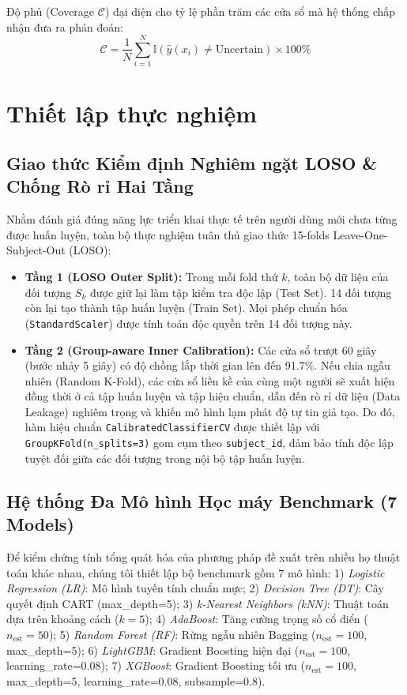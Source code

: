 \documentclass[conference]{IEEEtran}
\begin{document}
Độ phủ (Coverage $\mathcal{C}$) đại diện cho tỷ lệ phần trăm các cửa sổ mà hệ thống chấp nhận đưa ra phán đoán:
\begin{equation}
\mathcal{C} = \frac{1}{N} \sum_{i=1}^N \mathbb{I}(\hat{y}(x_i) \neq \text{Uncertain}) \times 100\%
\end{equation}

\section{Thiết lập thực nghiệm}

\subsection{Giao thức Kiểm định Nghiêm ngặt LOSO \& Chống Rò rỉ Hai Tầng}
Nhằm đánh giá đúng năng lực triển khai thực tế trên người dùng mới chưa từng được huấn luyện, toàn bộ thực nghiệm tuân thủ giao thức 15-folds Leave-One-Subject-Out (LOSO):
\begin{itemize}
    \item \textbf{Tầng 1 (LOSO Outer Split):} Trong mỗi fold thứ $k$, toàn bộ dữ liệu của đối tượng $S_k$ được giữ lại làm tập kiểm tra độc lập (Test Set). 14 đối tượng còn lại tạo thành tập huấn luyện (Train Set). Mọi phép chuẩn hóa (\texttt{StandardScaler}) được tính toán độc quyền trên 14 đối tượng này.
    \item \textbf{Tầng 2 (Group-aware Inner Calibration):} Các cửa sổ trượt 60 giây (bước nhảy 5 giây) có độ chồng lắp thời gian lên đến 91.7\%. Nếu chia ngẫu nhiên (Random K-Fold), các cửa sổ liền kề của cùng một người sẽ xuất hiện đồng thời ở cả tập huấn luyện và tập hiệu chuẩn, dẫn đến rò rỉ dữ liệu (Data Leakage) nghiêm trọng và khiến mô hình lạm phát độ tự tin giả tạo. Do đó, hàm hiệu chuẩn \texttt{CalibratedClassifierCV} được thiết lập với \texttt{GroupKFold(n\_splits=3)} gom cụm theo \texttt{subject\_id}, đảm bảo tính độc lập tuyệt đối giữa các đối tượng trong nội bộ tập huấn luyện.
\end{itemize}

\subsection{Hệ thống Đa Mô hình Học máy Benchmark (7 Models)}
Để kiểm chứng tính tổng quát hóa của phương pháp đề xuất trên nhiều họ thuật toán khác nhau, chúng tôi thiết lập bộ benchmark gồm 7 mô hình:
1) \textit{Logistic Regression (LR)}: Mô hình tuyến tính chuẩn mực;
2) \textit{Decision Tree (DT)}: Cây quyết định CART (max\_depth=5);
3) \textit{k-Nearest Neighbors (kNN)}: Thuật toán dựa trên khoảng cách ($k=5$);
4) \textit{AdaBoost}: Tăng cường trọng số cổ điển ($n_{\text{est}}=50$);
5) \textit{Random Forest (RF)}: Rừng ngẫu nhiên Bagging ($n_{\text{est}}=100$, max\_depth=5);
6) \textit{LightGBM}: Gradient Boosting hiện đại ($n_{\text{est}}=100$, learning\_rate=0.08);
7) \textit{XGBoost}: Gradient Boosting tối ưu ($n_{\text{est}}=100$, max\_depth=5, learning\_rate=0.08, subsample=0.8).
\end{document}
